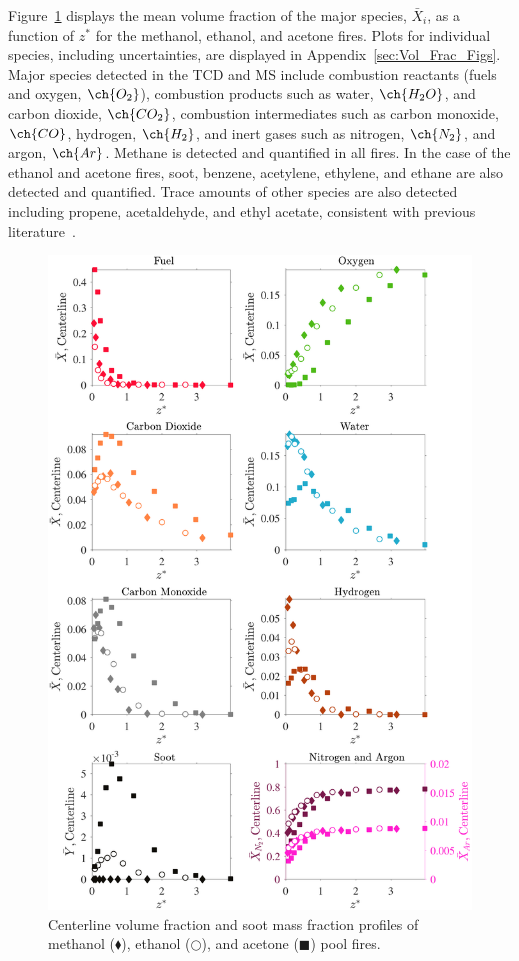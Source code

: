 \documentclass[12pt]{article}
\begin{document}
Figure~\ref{fig:Fuel_Comparison} displays the mean volume fraction of the major species, $\bar{X}_{i}$, as a function of $z^*$ for the methanol, ethanol, and acetone fires. Plots for individual species, including uncertainties, are displayed in Appendix~\ref{sec:Vol_Frac_Figs}. Major species detected in the TCD and MS include combustion reactants (fuels and oxygen, $\ch{O_2}$), combustion products such as water, $\ch{H_{2}O}$, and carbon dioxide, $\ch{CO_{2}}$, combustion intermediates such as carbon monoxide, $\ch{CO}$, hydrogen, $\ch{H_{2}}$, and inert gases such as nitrogen, $\ch{N_{2}}$, and argon, $\ch{Ar}$. Methane is detected and quantified in all fires. In the case of the ethanol and acetone fires, soot, benzene, acetylene, ethylene, and ethane are also detected and quantified. Trace amounts of other species are also detected including propene, acetaldehyde, and ethyl acetate, consistent with previous literature~\cite{Pichon2009, Gong2015}.

\begin{figure}[!]
	\centering
\includegraphics[width=12.5cm,keepaspectratio]{OVERALL_Fuel_Comparison.pdf}
	\caption[Centerline volume fraction and soot mass fraction profiles]{Centerline volume fraction and soot mass fraction profiles of methanol ($\blacklozenge$), ethanol ($\bigcirc$), and acetone ($\blacksquare$) pool fires.}
	\label{fig:Fuel_Comparison}
\end{figure}
\end{document}
